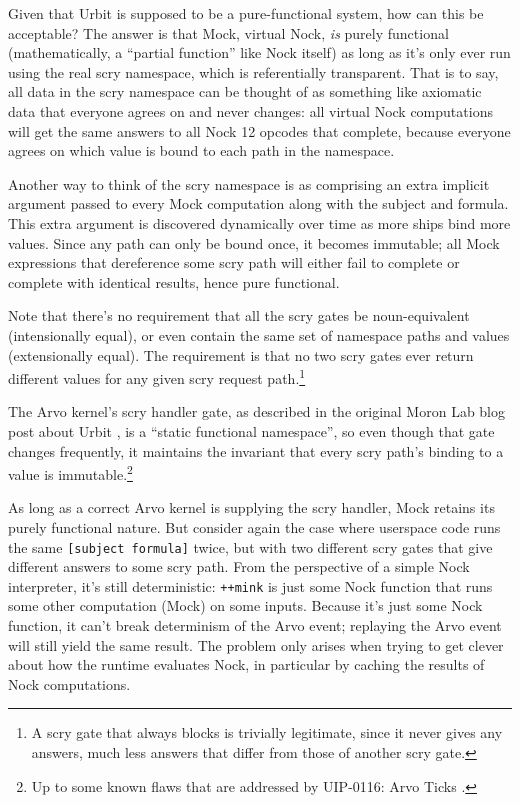 \documentclass[twoside]{article}
\begin{document}
Given that Urbit is supposed to be a pure-functional system, how can this be acceptable?  The answer is that Mock, virtual Nock, \emph{is} purely functional (mathematically, a ``partial function'' like Nock itself) as long as it's only ever run using the real scry namespace, which is referentially transparent.  That is to say, all data in the scry namespace can be thought of as something like axiomatic data that everyone agrees on and never changes:  all virtual Nock computations will get the same answers to all Nock 12 opcodes that complete, because everyone agrees on which value is bound to each path in the namespace.

Another way to think of the scry namespace is as comprising an extra implicit argument passed to every Mock computation along with the subject and formula.  This extra argument is discovered dynamically over time as more ships bind more values.  Since any path can only be bound once, it becomes immutable; all Mock expressions that dereference some scry path will either fail to complete or complete with identical results, hence pure functional.

Note that there's no requirement that all the scry gates be noun-equivalent (intensionally equal), or even contain the same set of namespace paths and values (extensionally equal). The requirement is that no two scry gates ever return different values for any given scry request path.\footnote{A scry gate that always blocks is trivially legitimate, since it never gives any answers, much less answers that differ from those of another scry gate.}

The Arvo kernel's scry handler gate, as described in the original Moron Lab blog post about Urbit \citep{Yarvin2010}, is a ``static functional namespace'', so even though that gate changes frequently, it maintains the invariant that every scry path's binding to a value is immutable.\footnote{Up to some known flaws that are addressed by UIP-0116: Arvo Ticks \citep{Monk2023, Monk2023a, Wilson2024}.}

As long as a correct Arvo kernel is supplying the scry handler, Mock retains its purely functional nature.  But consider again the case where userspace code runs the same \lstinline[style=inlinecode]{[subject formula]} twice, but with two different scry gates that give different answers to some scry path. From the perspective of a simple Nock interpreter, it's still deterministic:  \lstinline[style=inlinecode]{++mink} is just some Nock function that runs some other computation (Mock) on some inputs.  Because it's just some Nock function, it can't break determinism of the Arvo event; replaying the Arvo event will still yield the same result.  The problem only arises when trying to get clever about how the runtime evaluates Nock, in particular by caching the results of Nock computations.
\end{document}
